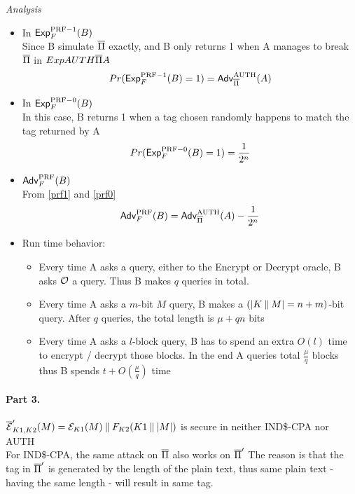 \documentclass[11pt]{article}
\begin{document}
\textit{Analysis}\\
\begin{itemize}
\item In $\mathsf{Exp}^{\mathrm{PRF-1}}_{F}{(B)}$\\
Since B simulate $\overline{\Pi}$ exactly, and B only returns 1 when A manages to break $\overline{\Pi}$ in $Exp{AUTH}{\overline{\Pi}}{A}$
\begin{equation}\label{prf1}
Pr(\mathsf{Exp}^{\mathrm{PRF-1}}_{F}{(B)}=1)= \mathsf{Adv}^{\mathrm{AUTH}}_{\overline{\Pi}}{(A)}
\end{equation}
\item In $\mathsf{Exp}^{\mathrm{PRF-0}}_{F}{(B)}$\\
In this case, B returns 1 when a tag chosen randomly happens to match the tag returned by A\\
\begin{equation}\label{prf0}
Pr(\mathsf{Exp}^{\mathrm{PRF-0}}_{F}{(B)}=1) = \frac{1}{2^n}
\end{equation}
\item $\mathsf{Adv}^{\mathrm{PRF}}_{F}{(B)}$\\
From \ref{prf1} and \ref{prf0}
\begin{equation}
\mathsf{Adv}^{\mathrm{PRF}}_{F}{(B)} = \mathsf{Adv}^{\mathrm{AUTH}}_{\overline{\Pi}}{(A)} -  \frac{1}{2^n}
\end{equation}
\item Run time behavior:\\
\begin{itemize}
\item Every time A asks a query, either to the Encrypt or Decrypt oracle, B asks ${\cal O}$ a query. Thus B makes $q$ queries in total.
\item Every time A asks a $m$-bit $M$ query, B makes a $(|K \:\|\: M| = n + m)$-bit query. After $q$ queries, the total length is $\mu + qn$ bits
\item Every time A asks a $l$-block query, B has to spend an extra $O(l)$ time to encrypt / decrypt those blocks. In the end A queries total $\frac{\mu}{q}$ blocks thus B spends $t+O(\frac{\mu}{q})$ time
\end{itemize}
\end{itemize}

\paragraph{Part 3.}
$\overline{\mathcal{E}}'_{K1,K2}(M) = {\cal E}_{K1}(M)\:\|\: F_{K2}(K1 \:\|\: |M|)$ is secure in neither IND\$-CPA nor AUTH\\

For IND\$-CPA, the same attack on $\overline{\Pi}$ also works on $\overline{\Pi}'$ The reason is that the tag in $\overline{\Pi}'$ is generated by the length of the plain text, thus same plain text - having the same length - will result in same tag.\\
\end{document}
